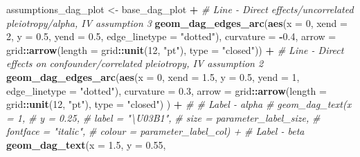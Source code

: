 \documentclass[
]{article}
\newenvironment{Shaded}{\begin{snugshade}}{\end{snugshade}}
\newcommand{\AttributeTok}[1]{\textcolor[rgb]{0.13,0.29,0.53}{#1}}
\newcommand{\CommentTok}[1]{\textcolor[rgb]{0.56,0.35,0.01}{\textit{#1}}}
\newcommand{\DecValTok}[1]{\textcolor[rgb]{0.00,0.00,0.81}{#1}}
\newcommand{\FloatTok}[1]{\textcolor[rgb]{0.00,0.00,0.81}{#1}}
\newcommand{\FunctionTok}[1]{\textcolor[rgb]{0.13,0.29,0.53}{\textbf{#1}}}
\newcommand{\NormalTok}[1]{#1}
\newcommand{\OtherTok}[1]{\textcolor[rgb]{0.56,0.35,0.01}{#1}}
\newcommand{\SpecialCharTok}[1]{\textcolor[rgb]{0.81,0.36,0.00}{\textbf{#1}}}
\newcommand{\StringTok}[1]{\textcolor[rgb]{0.31,0.60,0.02}{#1}}
\begin{document}
\begin{Shaded}
\begin{Highlighting}[]
\NormalTok{assumptions\_dag\_plot }\OtherTok{\textless{}{-}}\NormalTok{ base\_dag\_plot }\SpecialCharTok{+}
  \CommentTok{\# Line {-} Direct effects/uncorrelated pleiotropy/alpha, IV assumption 3}
  \FunctionTok{geom\_dag\_edges\_arc}\NormalTok{(}\FunctionTok{aes}\NormalTok{(}\AttributeTok{x =} \DecValTok{0}\NormalTok{,}
                         \AttributeTok{xend =} \DecValTok{2}\NormalTok{,}
                         \AttributeTok{y =} \FloatTok{0.5}\NormalTok{,}
                         \AttributeTok{yend =} \FloatTok{0.5}\NormalTok{,}
                         \AttributeTok{edge\_linetype =} \StringTok{"dotted"}\NormalTok{),}
                     \AttributeTok{curvature =} \SpecialCharTok{{-}}\FloatTok{0.4}\NormalTok{,}
                     \AttributeTok{arrow =}\NormalTok{ grid}\SpecialCharTok{::}\FunctionTok{arrow}\NormalTok{(}\AttributeTok{length =}\NormalTok{ grid}\SpecialCharTok{::}\FunctionTok{unit}\NormalTok{(}\DecValTok{12}\NormalTok{, }\StringTok{"pt"}\NormalTok{), }\AttributeTok{type =} \StringTok{"closed"}\NormalTok{)) }\SpecialCharTok{+}
  \CommentTok{\# Line {-} Direct effects on confounder/correlated pleiotropy, IV assumption 2}
  \FunctionTok{geom\_dag\_edges\_arc}\NormalTok{(}\FunctionTok{aes}\NormalTok{(}\AttributeTok{x =} \DecValTok{0}\NormalTok{,}
                         \AttributeTok{xend =} \FloatTok{1.5}\NormalTok{,}
                         \AttributeTok{y =} \FloatTok{0.5}\NormalTok{,}
                         \AttributeTok{yend =} \DecValTok{1}\NormalTok{,}
                         \AttributeTok{edge\_linetype =} \StringTok{"dotted"}\NormalTok{),}
                     \AttributeTok{curvature =} \FloatTok{0.3}\NormalTok{,}
                     \AttributeTok{arrow =}\NormalTok{ grid}\SpecialCharTok{::}\FunctionTok{arrow}\NormalTok{(}\AttributeTok{length =}\NormalTok{ grid}\SpecialCharTok{::}\FunctionTok{unit}\NormalTok{(}\DecValTok{12}\NormalTok{, }\StringTok{"pt"}\NormalTok{), }\AttributeTok{type =} \StringTok{"closed"}\NormalTok{)}
\NormalTok{                     ) }\SpecialCharTok{+}
  \CommentTok{\# \# Label {-} alpha}
  \CommentTok{\# geom\_dag\_text(x = 1, }
  \CommentTok{\#               y = 0.25, }
  \CommentTok{\#               label = "\textbackslash{}U03B1", }
  \CommentTok{\#               size = parameter\_label\_size,}
  \CommentTok{\#               fontface = "italic", }
  \CommentTok{\#               colour = parameter\_label\_col) +}
  \CommentTok{\# Label {-} beta}
  \FunctionTok{geom\_dag\_text}\NormalTok{(}\AttributeTok{x =} \FloatTok{1.5}\NormalTok{, }
                \AttributeTok{y =} \FloatTok{0.55}\NormalTok{, }

\end{Highlighting}
\end{Shaded}
\end{document}

